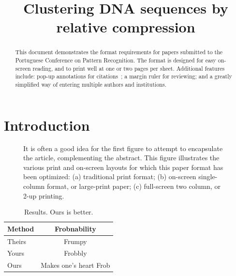 \documentclass[extendedabs]{recpad2k}
\title{Clustering DNA sequences by relative compression}
\begin{document}
\maketitle

\begin{abstract}
   This document demonstrates the format requirements for papers submitted
   to the Portuguese Conference on Pattern Recognition.  The format is designed for
   easy on-screen reading, and to print well at one or two pages per sheet.
   Additional features include: pop-up annotations for
   citations~\cite{Authors06,Mermin89}; a margin ruler for reviewing; and a
   greatly simplified way of entering multiple authors and institutions.
\end{abstract}

\section{Introduction}

\begin{figure}
   \caption{It is often a good idea for the first figure to attempt to
      encapsulate the article, complementing the abstract.  This figure illustrates
      the various print and on-screen layouts for which this paper format has
      been optimized: (a) traditional print format; (b) on-screen
      single-column format, or large-print paper; (c) full-screen two column, or
      2-up printing. }
   \label{fig:teaser}
\end{figure}


\begin{table}
   \begin{center}
      \begin{tabular}{|l|c|}
         \hline
         Method & Frobnability           \\
         \hline\hline
         Theirs & Frumpy                 \\
         Yours  & Frobbly                \\
         Ours   & Makes one's heart Frob \\
         \hline
      \end{tabular}
   \end{center}
   \caption{Results.   Ours is better.}
\end{table}

\end{document}
